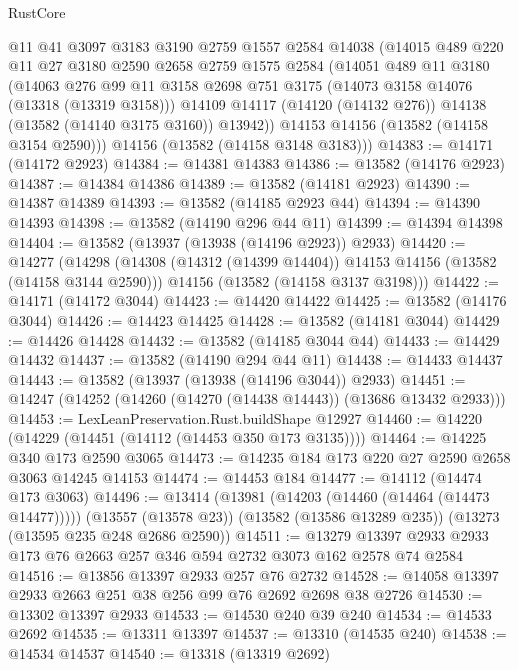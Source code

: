 \begin{lexlean}{RustCore}
\begin{coremodule}
      @11
      @41
      @3097
      @3183
      @3190
      @2759
      @1557
      @2584
      @14038
      (@14015
        @489
        @220
        @11
        @27
        @3180
        @2590
        @2658
        @2759
        @1575
        @2584
        (@14051
          @489
          @11
          @3180
          (@14063
            @276
            @99
            @11
            @3158
            @2698
            @751
            @3175
            (@14073 @3158 @14076 (@13318 (@13319 @3158)))
            @14109
            @14117
            (@14120 (@14132 @276))
            @14138
            (@13582 (@14140 @3175 @3160))
            @13942))
        @14153
        @14156
        (@13582 (@14158 @3154 @2590)))
      @14156
      (@13582 (@14158 @3148 @3183)))
@14383 := @14171 (@14172 @2923)
@14384 := @14381 @14383
@14386 := @13582 (@14176 @2923)
@14387 := @14384 @14386
@14389 := @13582 (@14181 @2923)
@14390 := @14387 @14389
@14393 := @13582 (@14185 @2923 @44)
@14394 := @14390 @14393
@14398 := @13582 (@14190 @296 @44 @11)
@14399 := @14394 @14398
@14404 := @13582 (@13937 (@13938 (@14196 @2923)) @2933)
@14420 := @14277
    (@14298
      (@14308 (@14312 (@14399 @14404)) @14153 @14156 (@13582 (@14158 @3144 @2590)))
      @14156
      (@13582 (@14158 @3137 @3198)))
@14422 := @14171 (@14172 @3044)
@14423 := @14420 @14422
@14425 := @13582 (@14176 @3044)
@14426 := @14423 @14425
@14428 := @13582 (@14181 @3044)
@14429 := @14426 @14428
@14432 := @13582 (@14185 @3044 @44)
@14433 := @14429 @14432
@14437 := @13582 (@14190 @294 @44 @11)
@14438 := @14433 @14437
@14443 := @13582 (@13937 (@13938 (@14196 @3044)) @2933)
@14451 := @14247 (@14252 (@14260 (@14270 (@14438 @14443)) (@13686 @13432 @2933)))
@14453 := LexLeanPreservation.Rust.buildShape @12927
@14460 := @14220 (@14229 (@14451 (@14112 (@14453 @350 @173 @3135))))
@14464 := @14225 @340 @173 @2590 @3065
@14473 := @14235 @184 @173 @220 @27 @2590 @2658 @3063 @14245 @14153
@14474 := @14453 @184
@14477 := @14112 (@14474 @173 @3063)
@14496 := @13414
    (@13981 (@14203 (@14460 (@14464 (@14473 @14477)))))
    (@13557 (@13578 @23))
    (@13582 (@13586 @13289 @235))
    (@13273 (@13595 @235 @248 @2686 @2590))
@14511 := @13279 @13397 @2933 @2933 @173 @76 @2663 @257 @346 @594 @2732 @3073 @162 @2578 @74 @2584
@14516 := @13856 @13397 @2933 @257 @76 @2732
@14528 := @14058 @13397 @2933 @2663 @251 @38 @256 @99 @76 @2692 @2698 @38 @2726
@14530 := @13302 @13397 @2933
@14533 := @14530 @240 @39 @240
@14534 := @14533 @2692
@14535 := @13311 @13397
@14537 := @13310 (@14535 @240)
@14538 := @14534 @14537
@14540 := @13318 (@13319 @2692)

\end{coremodule}
\end{lexlean}
